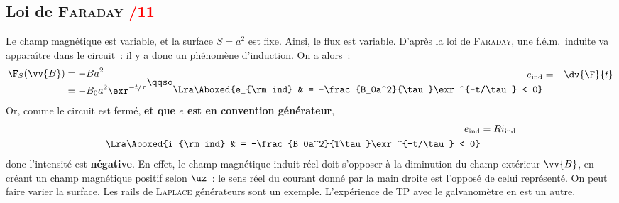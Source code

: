\documentclass[11pt]{book}
\begin{document}
{	\subsection{Loi de \textsc{Faraday} \hfill \textcolor{red}{/11}}
	\label{ssec:faraday}
	\begin{enumerate}[start=7]
		 Le champ magnétique est variable, et la surface $S = a^2$ est fixe.
		Ainsi, le flux est variable. D'après la loi de \textsc{Faraday}, une f.é.m.\
		induite va apparaître dans le circuit~: il y a donc un phénomène
		d'induction.
		On a alors~:
		\vspace{-10pt}
		\begin{gather*}
			\begin{aligned}{}
				\F_S(\vv{B}) & = -Ba^2
				\\
				             & = -B_0a^2\exr^{-t/\tau}
			\end{aligned}
			\qqso
			\begin{aligned}{}
				e_{\rm ind}         & = -\dv{\F}{t}
				\\\Lra
				\Aboxed{e_{\rm ind} & = -\frac{B_0a^2}{\tau}\exr^{-t/\tau} < 0}
			\end{aligned}
		\end{gather*}
		Or, comme le circuit est fermé, \textbf{et que $e$ est en convention
			générateur},
		\vspace{-10pt}
		\begin{align*}
			e_{\rm ind}         & = Ri_{\rm ind}
			\\\Lra
			\Aboxed{i_{\rm ind} & = -\frac{B_0a^2}{T\tau}\exr^{-t/\tau} < 0}
		\end{align*}
		donc l'intensité est \textbf{négative}.
		 En effet, le champ magnétique induit
		réel doit s'opposer à la diminution du champ extérieur $\vv{B}$, en créant un
		champ magnétique positif selon $\uz$~: le sens réel du courant donné par la
		main droite est l'opposé de celui représenté.
		 On peut faire varier la surface. Les rails de \textsc{Laplace}
		générateurs sont un exemple. L'expérience de TP avec le galvanomètre en est
		un autre.
	\end{enumerate}
}
\end{document}

